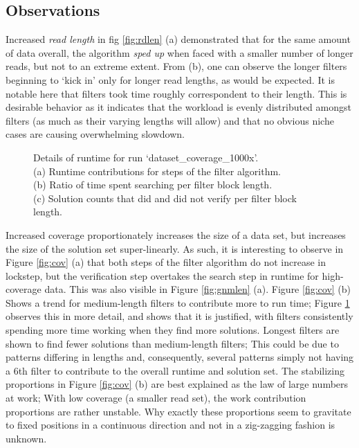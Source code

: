 \FloatBarrier

\subsection{Observations}

Increased \textit{read length} in fig \ref{fig:rdlen} (a) demonstrated that for the same amount of data overall, the algorithm \textit{sped up} when faced with a smaller number of longer \glspl{read}, but not to an extreme extent. From (b), one can observe the longer \glspl{filter} beginning to `kick in' only for longer read lengths, as would be expected. It is notable here that filters took time roughly correspondent to their length. This is desirable behavior as it indicates that the workload is evenly distributed amongst filters (as much as their varying lengths will allow) and that no obvious niche cases are causing overwhelming slowdown. 
\begin{figure}[]
\centering
{}
\caption[Details of runtime for run `dataset\_coverage\_1000x'.]{Details of runtime for run `dataset\_coverage\_1000x'.\\(a) Runtime contributions for steps of the filter algorithm.\\(b) Ratio of time spent searching per filter block length.\\(c) Solution counts that did and did not verify per filter block length.}
\label{fig:cov40k_details}
\end{figure}
Increased \gls{coverage} proportionately increases the size of a data set, but increases the size of the \gls{solution} set super-linearly. As such, it is interesting to observe in Figure \ref{fig:cov} (a) that both steps of the \gls{filter algorithm} do not increase in lockstep, but the \gls{verification step} overtakes the \gls{search step} in runtime for high-coverage data. This was also visible in Figure \ref{fig:gnmlen} (a). Figure \ref{fig:cov} (b) Shows a trend for medium-length filters to contribute more to run time; Figure \ref{fig:cov40k_details} observes this in more detail, and shows that it is justified, with filters consistently spending more time working when they find more \glspl{solution}. Longest filters are shown to find fewer solutions than medium-length filters; This could be due to patterns differing in lengths and, consequently, several patterns simply not having a 6th filter to contribute to the overall runtime and solution set. The stabilizing proportions in Figure \ref{fig:cov} (b) are best explained as the law of large numbers at work; With low coverage (a smaller read set), the work contribution proportions are rather unstable. Why exactly these proportions seem to gravitate to fixed positions in a continuous direction and not in a zig-zagging fashion is unknown.




